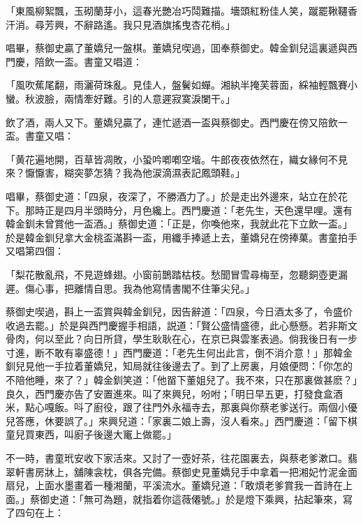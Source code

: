 \begin{myquote}
「東風柳絮飄，玉砌蘭芽小，這春光艷冶巧鬦難描。墻頭紅粉佳人笑，蹴罷鞦韆香汗消。尋芳興，不辭路遙。我只見酒旗搖曳杏花梢。」
\end{myquote}

唱畢，蔡御史贏了董嬌兒一盤棋。董嬌兒喫過，囬奉蔡御史。韓金釧兒這裏遞與西門慶，陪飲一盃。書童又唱道：

\begin{myquote}
「風吹蕉尾翻，雨灑荷珠亂。見佳人，盤鬢如蟬。湘紈半掩芙蓉面，綵袖輕飄賽小蠻。秋波臉，兩情牽好難。引的人意遲寂寞淚闌干。」
\end{myquote}

飲了酒，兩人又下。董嬌兒贏了，連忙遞酒一盃與蔡御史。西門慶在傍又陪飲一盃。書童又唱：

\begin{myquote}
「黄花遍地開，百草皆凋敗，小蛩吟喞喞空堦。牛郎夜夜依然在，織女緣何不見來？懨懨害，糊突夢怎猜？我為他涙滴濕表記鳳頭鞋。」
\end{myquote}

唱畢，蔡御史道：「四泉，夜深了，不勝酒力了。」於是走出外邊來，站立在於花下。那時正是四月半頭時分，月色纔上。西門慶道：「老先生，天色還早哩。還有韓金釧未曾賞他一盃酒。」蔡御史道：「正是，你喚他來，我就此花下立飲一盃。」於是韓金釧兒拿大金桃盃滿斟一盃，用纖手捧遞上去，董嬌兒在傍捧菓。書童拍手又唱第四個：

\begin{myquote}
「梨花散亂飛，不見遊蜂翅。小窗前鵲踏枯枝。愁聞冒雪尋梅至，忽聽銅壺更漏遲。傷心事，把離情自思。我為他寫情書閣不住筆尖兒。」
\end{myquote}

蔡御史喫過，斟上一盃賞與韓金釧兒，因告辭道：「四泉，今日酒太多了，令盛价收過去罷。」於是與西門慶握手相語，説道：「賢公盛情盛德，此心懸懸。若非斯文骨肉，何以至此？向日所貸，學生耿耿在心，在京已與雲峯表過。倘我後日有一步寸進，断不敢有辜盛德！」西門慶道：「老先生何出此言，倒不消介意！」那韓金釧兒見他一手拉着董嬌兒，知局就往後邊去了。到了上房裏，月娘便問：「你怎的不陪他睡，來了？」韓金釧笑道：「他㽞下董姐兒了。我不來，只在那裏做甚麽？」良久，西門慶亦告了安置進來。叫了來興兒，吩咐；「明日早五更，打發食盒酒米，點心嘎飯。呌了廚役，跟了往門外永福寺去，那裏與你蔡老爹送行。兩個小優兒答應，休要誤了。」來興兒道：「家裏二娘上壽，沒人看來。」西門慶道：「留下棋童兒買東西，叫廚子後邊大竃上做罷。」

不一時，書童玳安收下家活來。又討了一壺好茶，往花園裏去，與蔡老爹漱口。翡翠軒書房牀上，舖陳衾枕，俱各完備。蔡御史見董嬌兒手中拿着一把湘妃竹泥金面扇兒，上面水墨畫着一種湘蘭，平溪流水。董嬌兒道：「敢煩老爹賞我一首詩在上面。」蔡御史道：「無可為題，就指着你這薇僊號。」於是燈下乘興，拈起筆來，寫了四句在上：

